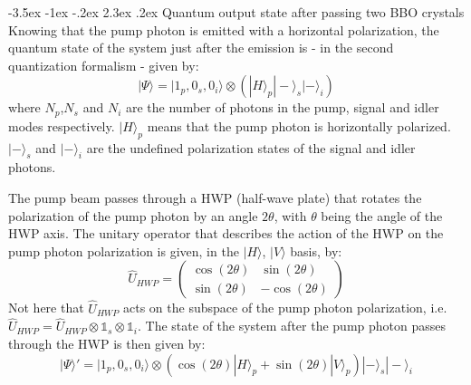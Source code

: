 \documentclass[a4paper, 12pt,oneside]{article}
\makeatletter
\renewcommand{\subsection}{\@startsection {subsection}{1}{\z@}%
             {-3.5ex \@plus -1ex \@minus -.2ex}%
             {2.3ex \@plus.2ex}%
             {\normalfont\normalsize\bfseries}}
\makeatother
\begin{document}
\subsection{Quantum output state after passing two BBO crystals}
Knowing that the pump photon is emitted with a horizontal polarization, the quantum state of the system just after the emission is - in the second quantization formalism - given by:
\begin{equation}
    |\Psi\rangle = |1_p,0_s,0_i\rangle \otimes (|H\rangle_p |-\rangle_s |-\rangle_i)
\end{equation}
where $N_p$,$N_s$ and $N_i$ are the number of photons in the pump, signal and idler modes respectively. $|H\rangle_p$ means that the pump photon is horizontally polarized. $|-\rangle_s$ and $|-\rangle_i$ are the undefined polarization states of the signal and idler photons.

The pump beam passes through a HWP (half-wave plate) that rotates the polarization of the pump photon by an angle $2\theta$, with $\theta$ being the angle of the HWP axis. The unitary operator that describes the action of the HWP on the pump photon polarization is given, in the $|H\rangle$, $|V\rangle$ basis, by:
\begin{equation}
    \hat{U}_{HWP} = \begin{pmatrix}
        \cos(2\theta) & \sin(2\theta) \\
        \sin(2\theta) & -\cos(2\theta)
    \end{pmatrix}
\end{equation}
Not here that $\hat{U}_{HWP}$ acts on the subspace of the pump photon polarization, i.e. $\hat{U}_{HWP}= \hat{U}_{HWP} \otimes \mathbb{1}_s \otimes \mathbb{1}_i$. The state of the system after the pump photon passes through the HWP is then given by:
\begin{equation}
    |\Psi\rangle' = |1_p,0_s,0_i\rangle \otimes (\cos(2\theta)|H\rangle_p + \sin(2\theta)|V\rangle_p) |-\rangle_s |-\rangle_i
\end{equation}
\end{document}
